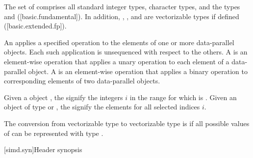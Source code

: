 \pnum\label{wording.vectorizable.types}%
The set of  comprises all standard integer types,
character types, and the types  and 
([basic.fundamental]).
In addition, , , and
 are vectorizable types if defined ([basic.extended.fp]).

\pnum
An  applies a specified operation to the elements of one or more data-parallel objects. Each such application is unsequenced with respect to the others. A  is an element-wise operation that applies a unary operation to each element of a data-parallel object. A  is an element-wise operation that applies a binary operation to corresponding elements of two data-parallel objects.

\pnum\label{wording.selected.indices}%
Given a  object , the
 signify the integers $i$ in the range \tcode{[0,
mask.size())} for which  is .
Given an object  of type  or ,
the  signify the elements  for all selected indices $i$.

\pnum
The conversion from vectorizable type  to vectorizable type  is  if
all possible values of  can be represented with type .

[simd.syn]{Header \texorpdfstring{}{<simd>} synopsis}

